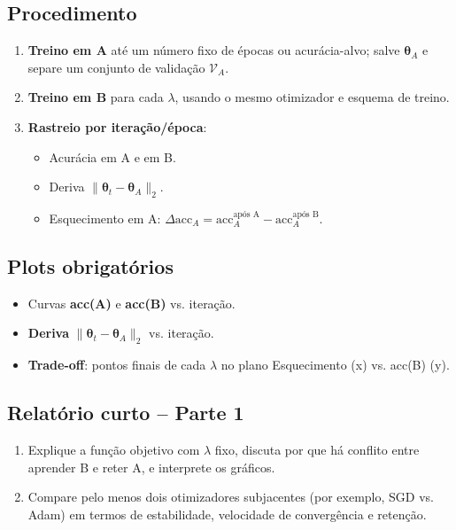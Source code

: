 \documentclass[9pt,a4paper]{extarticle}
\begin{document}
\subsection*{Procedimento}
\begin{enumerate}
  \item \textbf{Treino em A} até um número fixo de épocas ou acurácia-alvo; salve $\bm{\theta}_A$ e separe um conjunto de validação $\mathcal{V}_A$.
  \item \textbf{Treino em B} para cada $\lambda$, usando o mesmo otimizador e esquema de treino.
  \item \textbf{Rastreio por iteração/época}:
    \begin{itemize}
      \item Acurácia em A e em B.
      \item Deriva $\|\bm{\theta}_t-\bm{\theta}_A\|_2$.
      \item Esquecimento em A: $\Delta\mathrm{acc}_A = \mathrm{acc}_A^{\text{após A}} - \mathrm{acc}_A^{\text{após B}}$.
    \end{itemize}
\end{enumerate}

\subsection*{Plots obrigatórios}
\begin{itemize}
  \item Curvas \textbf{acc(A)} e \textbf{acc(B)} vs. iteração.
  \item \textbf{Deriva} $\|\bm{\theta}_t-\bm{\theta}_A\|_2$ vs. iteração.
  \item \textbf{Trade-off}: pontos finais de cada $\lambda$ no plano Esquecimento (x) vs. acc(B) (y).
\end{itemize}

\subsection*{Relatório curto -- Parte 1}
\begin{enumerate}
    \item Explique a função objetivo com $\lambda$ fixo, discuta por que há conflito entre aprender B e reter A, e interprete os gráficos.
    \item Compare pelo menos dois otimizadores subjacentes (por exemplo, SGD vs. Adam) em termos de estabilidade, velocidade de convergência e retenção.
\end{enumerate}
\end{document}
